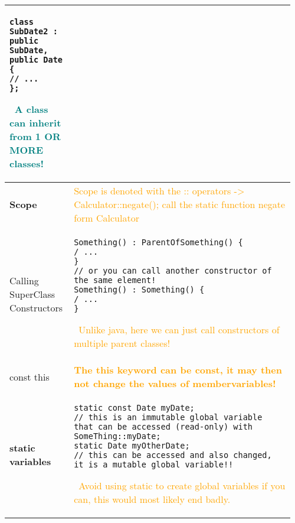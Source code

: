\documentclass[main.tex,fontsize=8pt,paper=a4,paper=portrait,DIV=calc,]{scrartcl}
\begin{document}
\begin{table}[ht!]
\begin{tabular}{|m{0.2\linewidth}|m{0.755\linewidth}|}
\begin{lstlisting}
class SubDate2 : public SubDate, public Date {
// ...
};
\end{lstlisting}
\, \newline
\textcolor{teal}{A class can inherit from 1 \textbf{OR MORE} classes!}\\
\hline
\textbf{Scope} & 
\textcolor{orange}{Scope is denoted with the :: operators -> Calculator::negate(); \newline call the static function negate form Calculator}\\
\hline
Calling SuperClass Constructors & 
\begin{lstlisting}
Something() : ParentOfSomething() {
/ ...
}
// or you can call another constructor of the same element!
Something() : Something() {
/ ...
}
\end{lstlisting}
\, \newline
\textcolor{orange}{Unlike java, here we can just call constructors of multiple parent classes!}\\
\hline
const this & 
\textcolor{orange}{\textbf{The this keyword can be const, it may then not change the values of membervariables!}}\\
\hline 
\textbf{static variables} &
\begin{lstlisting}
static const Date myDate;
// this is an immutable global variable that can be accessed (read-only) with SomeThing::myDate;
static Date myOtherDate;
// this can be accessed and also changed, it is a mutable global variable!!
\end{lstlisting}
\, \newline
\textcolor{orange}{Avoid using static to create global variables if you can, this would most likely end badly.}\\
\hline
\end{tabular}
\end{table}
\pagebreak
\end{document}
